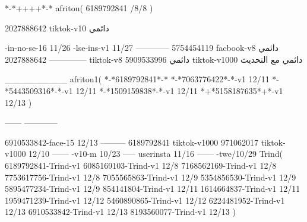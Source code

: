 *-*++++*-*
afriton(
6189792841 /8/8
)

2027888642 tiktok-v10
دائمي

-in-no-se-16 11/26
-lse-ins-v1 11/27
------------
5754454119 facbook-v8
دائمي
--------------
2027888642 tiktok-v8
دائمي
5909533996 tiktok-v1000
دائمي مع التحديث

__________
afriton1(
*-*6189792841*-*
*-*7063776422*-*-v1 12/11
*-*5443509316*-*-v1 12/11
*-*1509159838*-*-v1 12/11
*+*5158187635*+*-v1 12/13
)

------
------------


6910533842-face-15 12/13
---------
6189792841 tiktok-v1000
971062017 tiktok-v1000 12/10
------
-v10-m 10/23
-----
userinsta 11/16
------
-twe/10/29
Trind(
6189792841-Trind-v1 
6085169103-Trind-v1 12/8
7168562169-Trind-v1 12/8
7753617756-Trind-v1 12/8
7055565863-Trind-v1 12/9
5354856530-Trind-v1 12/9
5895477234-Trind-v1 12/9
854141804-Trind-v1 12/11
1614664837-Trind-v1 12/11
1959471239-Trind-v1 12/12
5460890865-Trind-v1 12/12
6224481952-Trind-v1 12/13
6910533842-Trind-v1 12/13
8193560077-Trind-v1 12/13
)
